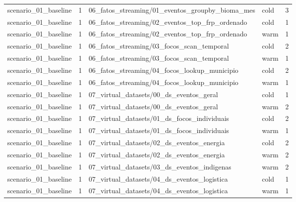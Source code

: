{\begin{longtable}{p{}p{}p{}p{}p{}}
scenario\_01\_baseline & 1 & 06\_fatos\_streaming/01\_eventos\_groupby\_bioma\_mes & cold & 3 \\
scenario\_01\_baseline & 1 & 06\_fatos\_streaming/02\_eventos\_top\_frp\_ordenado & cold & 1 \\
scenario\_01\_baseline & 1 & 06\_fatos\_streaming/02\_eventos\_top\_frp\_ordenado & warm & 1 \\
scenario\_01\_baseline & 1 & 06\_fatos\_streaming/03\_focos\_scan\_temporal & cold & 2 \\
scenario\_01\_baseline & 1 & 06\_fatos\_streaming/03\_focos\_scan\_temporal & warm & 1 \\
scenario\_01\_baseline & 1 & 06\_fatos\_streaming/04\_focos\_lookup\_municipio & cold & 2 \\
scenario\_01\_baseline & 1 & 06\_fatos\_streaming/04\_focos\_lookup\_municipio & warm & 1 \\
scenario\_01\_baseline & 1 & 07\_virtual\_datasets/00\_ds\_eventos\_geral & cold & 1 \\
scenario\_01\_baseline & 1 & 07\_virtual\_datasets/00\_ds\_eventos\_geral & warm & 2 \\
scenario\_01\_baseline & 1 & 07\_virtual\_datasets/01\_ds\_focos\_individuais & cold & 2 \\
scenario\_01\_baseline & 1 & 07\_virtual\_datasets/01\_ds\_focos\_individuais & warm & 1 \\
scenario\_01\_baseline & 1 & 07\_virtual\_datasets/02\_ds\_eventos\_energia & cold & 2 \\
scenario\_01\_baseline & 1 & 07\_virtual\_datasets/02\_ds\_eventos\_energia & warm & 2 \\
scenario\_01\_baseline & 1 & 07\_virtual\_datasets/03\_ds\_eventos\_indigenas & warm & 2 \\
scenario\_01\_baseline & 1 & 07\_virtual\_datasets/04\_ds\_eventos\_logistica & cold & 1 \\
scenario\_01\_baseline & 1 & 07\_virtual\_datasets/04\_ds\_eventos\_logistica & warm & 1 \\
\bottomrule
\end{longtable}
}
